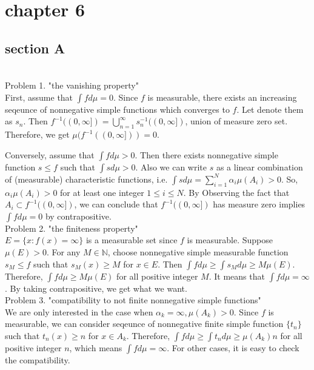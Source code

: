 \section*{chapter 6}
\subsection*{section A}\hfill \\

Problem 1. "the vanishing property"\\

First, assume that $\int f d\mu = 0$. Since $f$ is measurable, there exists
an increasing seqeunce of nonnegative simple functions which converges to $f$. Let
denote them as $s_n$. Then $f^{-1}((0, \infty]) = \bigcup_{n=1}^{\infty}s_n ^{-1}((0, \infty])$, union of measure zero set.
Therefore, we get $\mu(f^{-1}((0, \infty])) = 0$.

Conversely, assume that $\int f d\mu > 0$. Then there exists nonnegative
simple function $s \leq f$ such that $\int s d\mu > 0$. Also we can write $s$ as
a linear combination of (measurable) characteristic functions, i.e. $\int s d \mu = \sum_{i=1}^N \alpha_i \mu(A_i) >0$.
So, $\alpha_i \mu(A_i) > 0$ for at least one integer $1 \leq i \leq N$. By Observing the fact that $A_i \subset f^{-1}((0, \infty])$,
we can conclude that $f^{-1}((0, \infty])$ has measure zero implies $\int f d \mu = 0$ by contrapositive.\\

Problem 2. "the finiteness property"\\

$E = \{x: f(x) = \infty \}$ is a measurable set since $f$ is measurable.
Suppose $\mu(E) > 0$. For any $M \in \mathbb{N}$, choose nonnegative simple measurable function $s_M \leq f$ such that $s_M(x) \geq M$ for $x \in E$.
Then $\int f d\mu \geq \int s_M d\mu \geq M \mu(E)$. Therefore, $\int f d\mu \geq M \mu(E)$ for all positive integer $M$.
It means that $\int f d\mu = \infty$. By taking contrapositive, we get what we want.\\

Problem 3. "compatibility to not finite nonnegative simple functions" \\

We are only interested in the case when $\alpha_k = \infty, \mu(A_k) > 0$.
Since $f$ is measurable, we can consider seqeunce of nonnegative finite simple function
$\{ t_n\}$ such that $t_n(x) \geq n$ for $x \in A_k$.
Therefore, $\int f d\mu \geq \int t_n d\mu \geq \mu(A_k)n$ for all positive integer $n$, which means $\int f d\mu = \infty$.
For other cases, it is easy to check the compatibility.\\

